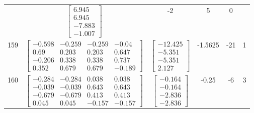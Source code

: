 \documentclass[a4paper,12pt]{article}
\begin{document}
\begin{tabular}{c c c c c c}
&
$\begin{bmatrix} 6.945 \\ 6.945 \\ -7.883 \\ -1.007 \end{bmatrix}$
&
-2
&
5
&
0
\\
159
&
$\begin{bmatrix} -0.598 & -0.259 & -0.259 & -0.04 \\ 0.69 & 0.203 & 0.203 & 0.647 \\ -0.206 & 0.338 & 0.338 & 0.737 \\ 0.352 & 0.679 & 0.679 & -0.189 \end{bmatrix}$
&
$\begin{bmatrix} -12.425 \\ -5.351 \\ -5.351 \\ 2.127 \end{bmatrix}$
&
-1.5625
&
-21
&
1
\\
160
&
$\begin{bmatrix} -0.284 & -0.284 & 0.038 & 0.038 \\ -0.039 & -0.039 & 0.643 & 0.643 \\ -0.679 & -0.679 & 0.413 & 0.413 \\ 0.045 & 0.045 & -0.157 & -0.157 \end{bmatrix}$
&
$\begin{bmatrix} -0.164 \\ -0.164 \\ -2.836 \\ -2.836 \end{bmatrix}$
&
-0.25
&
-6
&
3
\\
\end{tabular} \egroup \newpage
\end{document}
